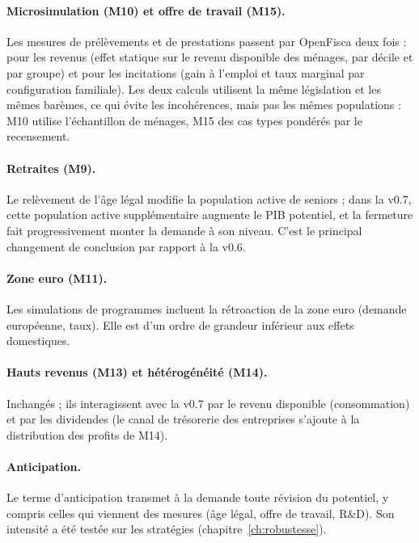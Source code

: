 \paragraph{Microsimulation (M10) et offre de travail (M15).} Les mesures de prélèvements et de prestations passent
par OpenFisca deux fois : pour les revenus (effet statique sur le revenu disponible des ménages, par décile et par
groupe) et pour les incitations (gain à l'emploi et taux marginal par configuration familiale). Les deux calculs
utilisent la même législation et les mêmes barèmes, ce qui évite les incohérences, mais pas les mêmes populations :
M10 utilise l'échantillon de ménages, M15 des cas types pondérés par le recensement.

\paragraph{Retraites (M9).} Le relèvement de l'âge légal modifie la population active de seniors ; dans la v0.7,
cette population active supplémentaire augmente le PIB potentiel, et la fermeture fait progressivement monter la
demande à son niveau. C'est le principal changement de conclusion par rapport à la v0.6.

\paragraph{Zone euro (M11).} Les simulations de programmes incluent la rétroaction de la zone euro (demande
européenne, taux). Elle est d'un ordre de grandeur inférieur aux effets domestiques.

\paragraph{Hauts revenus (M13) et hétérogénéité (M14).} Inchangés ; ils interagissent avec la v0.7 par le revenu
disponible (consommation) et par les dividendes (le canal de trésorerie des entreprises s'ajoute à la distribution
des profits de M14).

\paragraph{Anticipation.} Le terme d'anticipation transmet à la demande toute révision du potentiel, y compris celles
qui viennent des mesures (âge légal, offre de travail, R\&D). Son intensité a été testée sur les stratégies
(chapitre~\ref{ch:robustesse}).
